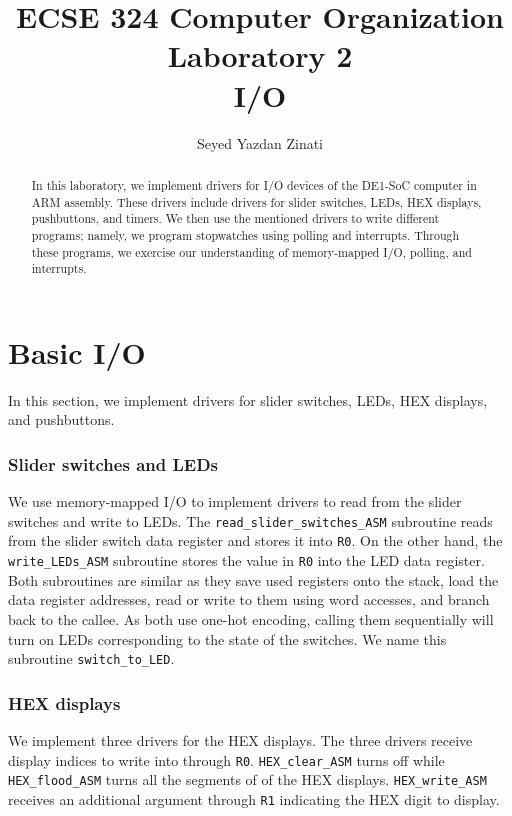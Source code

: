 \documentclass[10pt]{article}
\begin{document}
\title{\textbf{ECSE 324 Computer Organization}\\
    Laboratory 2\\
    I/O
}

\author{Seyed Yazdan Zinati}
\maketitle

\begin{abstract}
    In this laboratory, we implement drivers for I/O devices of the DE1-SoC computer in ARM assembly. These drivers include drivers for slider switches, LEDs, HEX displays, pushbuttons, and timers. We then use the mentioned drivers to write different programs; namely, we program stopwatches using polling and interrupts. Through these programs, we exercise our understanding of memory-mapped I/O, polling, and interrupts.
\end{abstract}

\section{Basic I/O}
In this section, we implement drivers for slider switches, LEDs, HEX displays, and pushbuttons.
\subsubsection*{Slider switches and LEDs}
We use memory-mapped I/O to implement drivers to read from the slider switches and write to LEDs. The \verb+read_slider_switches_ASM+ subroutine reads from the slider switch data register and stores it into \verb+R0+.  On the other hand, the\verb+ write_LEDs_ASM+ subroutine stores the value in \verb+R0+ into the LED data register. Both subroutines are similar as they save used registers onto the stack, load the data register addresses, read or write to them using word accesses, and branch back to the callee. As both use one-hot encoding, calling them sequentially will turn on LEDs corresponding to the state of the switches. We name this subroutine \verb+switch_to_LED+.
\subsubsection*{HEX displays}
We implement three drivers for the HEX displays. The three drivers receive display indices to write into through \verb+R0+. \verb+HEX_clear_ASM+ turns off while \verb+HEX_flood_ASM+ turns all the segments of of the HEX displays. \verb+HEX_write_ASM+ receives an additional argument through \verb+R1+ indicating the HEX digit to display.
\end{document}
